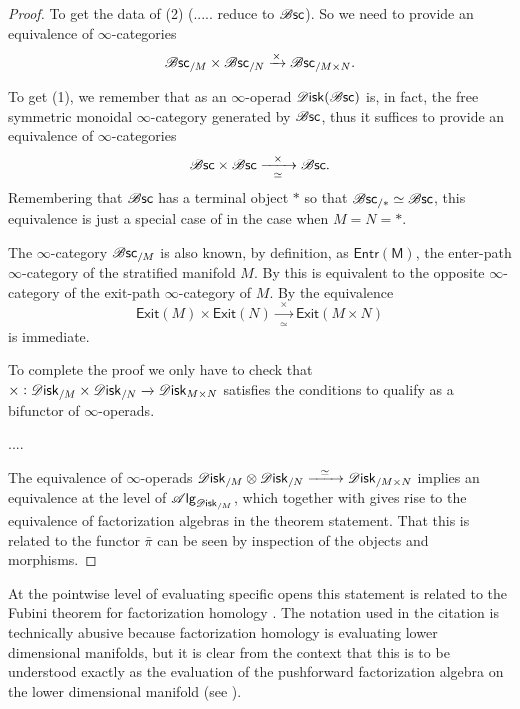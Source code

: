 \documentclass[../text.tex]{subfiles}
\begin{document}
\begin{proof}
    To get the data of (2) (..... reduce to $\mathscr{B} \mathsf{sc}$). So we need to provide an equivalence of $\infty$-categories
    \begin{equation}\label{eq:b/M_x_b/N=b/MxN}
        \mathscr{B} \mathsf{sc}_{/M} \times \mathscr{B} \mathsf{sc}_{/N} \xrightarrow{\times} \mathscr{B} \mathsf{sc}_{/M \times N}.
    \end{equation}

    To get (1), we remember that as an $\infty$-operad $\disk(\bsc)$ is, in fact, the free symmetric monoidal $\infty$-category generated by $\mathscr{B} \mathsf{sc}$, thus it suffices to provide an equivalence of $\infty$-categories
    \begin{equation}
        \bsc \times \bsc \xrightarrow[\ \ \simeq \ \ ]{\times} \bsc.
    \end{equation}
    Remembering that $\mathscr{B} \mathsf{sc}$ has a terminal object $*$ so that $\mathscr{B} \mathsf{sc}_{/*} \simeq \mathscr{B} \mathsf{sc}$, this equivalence is just a special case of  in the case when $M = N = *$.

    The $\infty$-category $\mathscr{B} \mathsf{sc}_{/M}$ is also known, by definition, as $\mathsf{Entr(M)}$, the enter-path $\infty$-category of the stratified manifold $M$. By \cite[Lem.3.3.9]{afr_homhyp} this is equivalent to the opposite $\infty$-category of the exit-path $\infty$-category of $M$. By \cite[Obs.3.3.3]{afr_homhyp} the equivalence
    \begin{equation}
        \mathsf{Exit}(M) \times \mathsf{Exit}(N) \xrightarrow[\ \ \simeq \ \ ]{\times} \mathsf{Exit}(M \times N)
    \end{equation}
    is immediate.

    To complete the proof we only have to check that $\times: \disk_{/M} \times \disk_{/N} \xrightarrow{} \disk_{M \times N}$ satisfies the conditions to qualify as a bifunctor of $\infty$-operads.

    ....

    The equivalence of $\infty$-operads $\disk_{/M} \otimes \disk_{/N} \xrightarrow{\ \ \simeq \ \ } \disk_{/M \times N}$ implies an equivalence at the level of $\alg{\disk_{/M}}$, which together with  gives rise to the equivalence of factorization algebras in the theorem statement. That this is related to the functor $\bar{\pi}$ can be seen by inspection of the objects and morphisms.
\end{proof}

\begin{remark}
    At the pointwise level of evaluating specific opens this statement is related to the Fubini theorem for factorization homology \cite[cor.2.29]{aft_fhstrat}. The notation used in the citation is technically abusive because factorization homology is evaluating lower dimensional manifolds, but it is clear from the context that this is to be understood exactly as the evaluation of the pushforward factorization algebra on the lower dimensional manifold (see ).
\end{remark}
\end{document}
